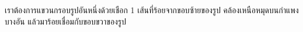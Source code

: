 \question{}

เราต้องการแขวนกรอบรูปอันหนึ่งด้วยเชือก 1 เส้นที่ร้อยจากขอบซ้ายของรูป คล้องเหนือหมุดบนกำแพงบางอัน 
แล้วมาร้อยเชื่อมกับขอบขวาของรูป

